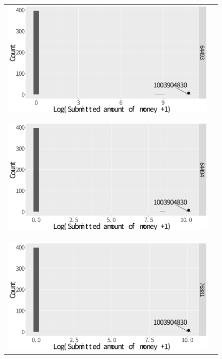 \documentclass[dvipdfmx, english]{ampmt}             %
\begin{document}
\begin{figure}[H]
	\begin{tabular}{cc}
	\begin{minipage}{.5\hsize}
	\centering
	\centerline{\includegraphics[scale=0.22]{../img/fraud/Neurosurgery-64493.pdf}}
	\subcaption{}\label{fig:Neuro1}
	\end{minipage} 
      \begin{minipage}{.5\hsize}
        \centering
        \centerline{\includegraphics[scale=0.22]{../img/fraud/Neurosurgery-64494.pdf}}
	\subcaption{}\label{fig:Neuro2}
      \end{minipage} \\
       \begin{minipage}{.5\hsize}
        \centering
        \centerline{\includegraphics[scale=0.22]{../img/fraud/Neurosurgery-76881.pdf}}

\end{minipage}
\end{tabular}
\end{figure}
\end{document}
